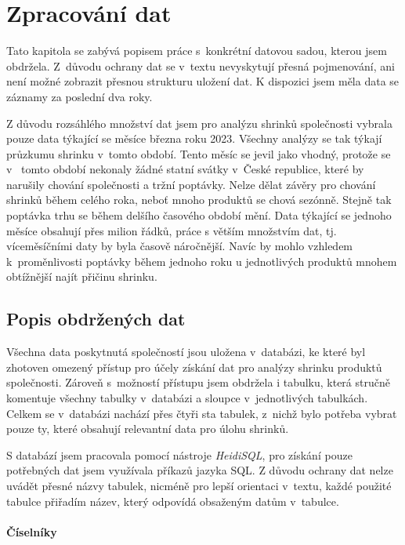 \chapter{Zpracování dat}

Tato kapitola se zabývá popisem práce s~konkrétní datovou sadou, kterou jsem obdržela. Z~důvodu ochrany dat se v~textu nevyskytují přesná pojmenování, ani není možné zobrazit přesnou strukturu uložení dat. K dispozici jsem měla data se záznamy za poslední dva roky. 

Z důvodu rozsáhlého množství dat jsem pro analýzu shrinků společnosti vybrala pouze data týkající se měsíce března roku 2023. Všechny analýzy se tak týkají průzkumu shrinku v~tomto období. Tento měsíc se jevil jako vhodný, protože se v~ tomto období nekonaly žádné statní svátky v~České republice, které by narušily chování společnosti a tržní poptávky. Nelze dělat závěry pro chování shrinků během celého roka, neboť mnoho produktů se chová sezónně. Stejně tak poptávka trhu se během delšího časového období mění.  Data týkající se jednoho měsíce obsahují přes milion řádků, práce s větším množstvím dat, tj. víceměsíčními daty by byla časově náročnější. Navíc by mohlo vzhledem k~proměnlivosti poptávky během jednoho roku u jednotlivých produktů mnohem obtížnější najít přičinu shrinku.

\section{Popis obdržených dat}

Všechna data poskytnutá společností jsou uložena v~databázi, ke které byl zhotoven omezený přístup pro účely získání dat pro analýzy shrinku produktů společnosti. Zároveň s~možností přístupu jsem obdržela i tabulku, která stručně komentuje všechny tabulky v~databázi a sloupce v~jednotlivých tabulkách. Celkem se v~databázi nachází přes čtyři sta tabulek, z~nichž bylo potřeba vybrat pouze ty, které obsahují relevantní data pro úlohu shrinků.

S databází jsem pracovala pomocí nástroje \emph{HeidiSQL}, pro získání pouze potřebných dat jsem využívala příkazů jazyka SQL.
Z důvodu ochrany dat nelze uvádět přesné názvy tabulek, nicméně pro lepší orientaci v~textu, každé použité tabulce přiřadím název, který odpovídá obsaženým datům v~tabulce. 

\subsubsection{Číselníky}

